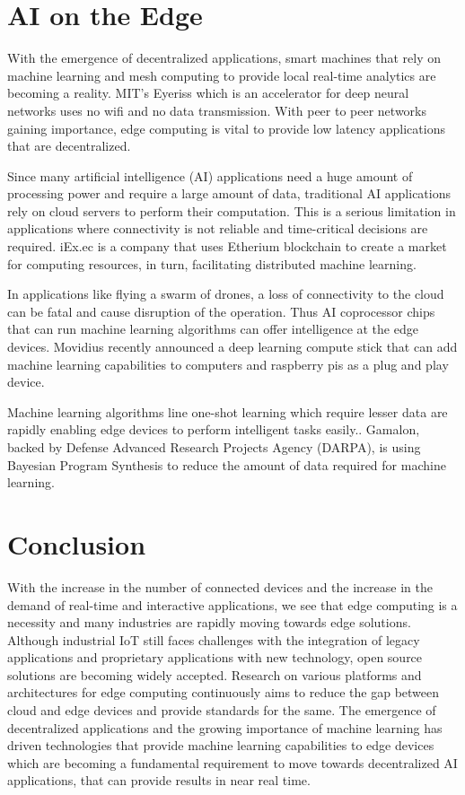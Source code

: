 \documentclass[sigconf]{acmart}
\begin{document}
\section{AI on the Edge}
With the emergence of decentralized applications, smart machines that rely on machine learning and mesh computing to provide local real-time analytics are becoming a reality. MIT's Eyeriss which is an accelerator for deep neural networks uses no wifi and no data transmission. With peer to peer networks gaining importance, edge computing is vital to provide low latency applications that are decentralized. \cite{ibm_iot_edge}

Since many artificial intelligence (AI) applications need a huge amount of processing power and require a large amount of data, traditional AI applications rely on cloud servers to perform their computation. This is a serious limitation in applications where connectivity is not reliable and time-critical decisions are required. \cite{ai-to-edge}iEx.ec is a company that uses Etherium blockchain to create a market for computing resources, in turn, facilitating distributed machine learning. \cite{iExec}

In applications like flying a swarm of drones, a loss of connectivity to the cloud can be fatal and cause disruption of the operation. Thus AI coprocessor chips that can run machine learning algorithms can offer intelligence at the edge devices. Movidius recently announced a deep learning compute stick\cite{movidius} that can add machine learning capabilities to computers and raspberry pis as a plug and play device.\cite{ai-to-edge}

Machine learning algorithms line one-shot learning which require lesser data are rapidly enabling edge devices to perform intelligent tasks easily.\cite{wiki-one-shot-learning}.
Gamalon, backed by Defense Advanced Research Projects Agency (DARPA), is using Bayesian Program Synthesis to reduce the amount of data required for machine learning.\cite{ai-to-edge}  

\section{Conclusion}
With the increase in the number of connected devices and the increase in the demand of real-time and interactive applications, we see that edge computing is a necessity and many industries are rapidly moving towards edge solutions. Although industrial IoT still faces challenges with the integration of legacy applications and proprietary applications with new technology, open source solutions are becoming widely accepted. Research on various platforms and architectures for edge computing continuously aims to reduce the gap between cloud and edge devices and provide standards for the same. The emergence of decentralized applications and the growing importance of machine learning has driven technologies that provide machine learning capabilities to edge devices which are becoming a fundamental requirement to move towards decentralized AI applications, that can provide results in near real time.
\end{document}
